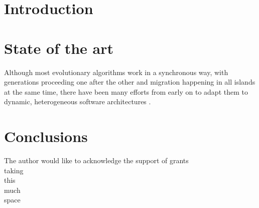 \section{Introduction}









\section{State of the art}

Although most evolutionary algorithms work in a synchronous way, with
generations proceeding one after the other and migration happening in
all islands at the same time, there have been many efforts from early
on to adapt them to dynamic, heterogeneous software architectures
\cite{Jini:FEA2000}. 

\section{Conclusions}





\begin{acks}

  The author would like to acknowledge the support of grants\\
  taking\\
  this\\
  much\\
  space\\

\end{acks}
